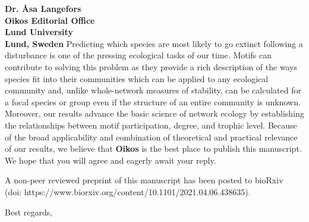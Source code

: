 \documentclass[12pt]{letter}
\begin{document}
\begin{letter}{\bf Dr. {\AA}sa Langefors \\
Oikos Editorial Office \\
Lund University \\
Lund, Sweden}
 	Predicting which species are most likely to go extinct following a disturbance is one of the pressing ecological tasks of our time. 
 	Motifs can contribute to solving this problem as they provide a rich description of the ways species fit into their communities which can be applied to any ecological community and, unlike whole-network measures of stability, can be calculated for a focal species or group even if the structure of an entire community is unknown.
 	Moreover, our results advance the basic science of network ecology by establishing the relationships between motif participation, degree, and trophic level. 
 	Because of the broad applicability and combination of theoretical and practical relevance of our results, we believe that \textbf{Oikos} is the best place to publish this manuscript. 
 	We hope that you will agree and eagerly await your reply.


	A non-peer reviewed preprint of this manuscript has been posted to bioRxiv \\\noindent(doi: https://www.biorxiv.org/content/10.1101/2021.04.06.438635).

\closing{Best regards,}


\end{letter}
\end{document}
